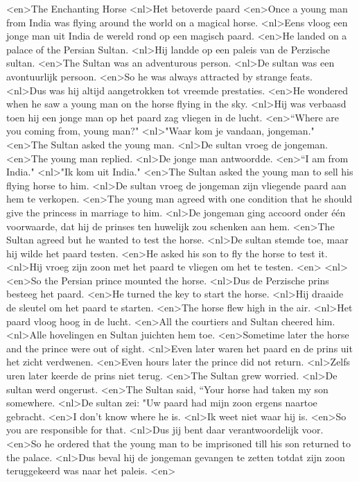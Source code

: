 <en>The Enchanting Horse
<nl>Het betoverde paard
<en>Once a young man from India was flying around the world on a magical horse.
<nl>Eens vloog een jonge man uit India de wereld rond op een magisch paard.
<en>He landed on a palace of the Persian Sultan.
<nl>Hij landde op een paleis van de Perzische sultan.
<en>The Sultan was an adventurous person.
<nl>De sultan was een avontuurlijk persoon.
<en>So he was always attracted by strange feats.
<nl>Dus was hij altijd aangetrokken tot vreemde prestaties.
<en>He wondered when he saw a young man on the horse flying in the sky.
<nl>Hij was verbaasd toen hij een jonge man op het paard zag vliegen in de lucht.
<en>“Where are you coming from, young man?"
<nl>"Waar kom je vandaan, jongeman."
<en>The Sultan asked the young man.
<nl>De sultan vroeg de jongeman.
<en>The young man replied.
<nl>De jonge man antwoordde.
<en>“I am from India."
<nl>"Ik kom uit India."
<en>The Sultan asked the young man to sell his flying horse to him.
<nl>De sultan vroeg de jongeman zijn vliegende paard aan hem te verkopen.
<en>The young man agreed with one condition that he should give the princess in marriage to him.
<nl>De jongeman ging accoord onder één voorwaarde, dat hij de prinses ten huwelijk zou schenken aan hem.
<en>The Sultan agreed but he wanted to test the horse.
<nl>De sultan stemde toe, maar hij wilde het paard testen.
<en>He asked his son to fly the horse to test it.
<nl>Hij vroeg zijn zoon met het paard te vliegen om het te testen.
<en>
<nl>
<en>So the Persian prince mounted the horse.
<nl>Dus de Perzische prins besteeg het paard.
<en>He turned the key to start the horse.
<nl>Hij draaide de sleutel om het paard te starten.
<en>The horse flew high in the air.
<nl>Het paard vloog hoog in de lucht.
<en>All the courtiers and Sultan cheered him.
<nl>Alle hovelingen en Sultan juichten hem toe.
<en>Sometime later the horse and the prince were out of sight.
<nl>Even later waren het paard en de prins uit het zicht verdwenen.
<en>Even hours later the prince did not return.
<nl>Zelfs uren later keerde de prins niet terug.
<en>The Sultan grew worried.
<nl>De sultan werd ongerust.
<en>The Sultan said, “Your horse had taken my son somewhere.
<nl>De sultan zei: "Uw paard had mijn zoon ergens naartoe gebracht.
<en>I don't know where he is.
<nl>Ik weet niet waar hij is.
<en>So you are responsible for that.
<nl>Dus jij bent daar verantwoordelijk voor.
<en>So he ordered that the young man to be imprisoned till his son returned to the palace.
<nl>Dus beval hij de jongeman gevangen te zetten totdat zijn zoon teruggekeerd was naar het paleis.
<en>
